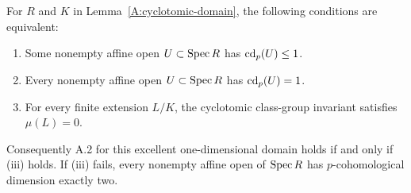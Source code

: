 \begin{theorem}
\label{A:Iwasawa-equivalence}
For $R$ and $K$ in Lemma~\ref{A:cyclotomic-domain}, the following
conditions are equivalent:
\begin{enumerate}[label=(\roman*)]
\item Some nonempty affine open $U\subset\operatorname{Spec} R$ has $\operatorname{cd}_p(U)\leq1$.
\item Every nonempty affine open $U\subset\operatorname{Spec} R$ has $\operatorname{cd}_p(U)=1$.
\item For every finite extension $L/K$, the cyclotomic class-group
      invariant satisfies $\mu(L)=0$.
\end{enumerate}
Consequently A.2 for this excellent one-dimensional domain holds
if and only if (iii) holds. If (iii) fails, every nonempty affine open
of $\operatorname{Spec} R$ has $p$-cohomological dimension exactly two.
\end{theorem}
